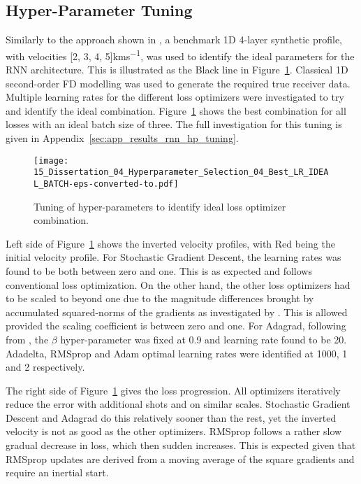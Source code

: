 \subsection{Hyper-Parameter Tuning}\label{sec:rnn_hp_tunin}
Similarly to the approach shown in \cite{Sun2019}, a benchmark 1D 4-layer synthetic profile, with velocities [2, 3, 4, 5]\si{kms^{-1}}, was used to identify the ideal parameters for the RNN architecture. This is illustrated as the Black line in Figure~\ref{fig:rnn_hp_tuning}. Classical 1D second-order FD modelling was used to generate the required true receiver data. Multiple learning rates for the different loss optimizers were investigated to try and identify the ideal combination. Figure~\ref{fig:rnn_hp_tuning} shows the best combination for all losses with an ideal batch size of three. The full investigation for this tuning is given in Appendix~\ref{sec:app_results_rnn_hp_tuning}. 

\begin{figure}[ht!]
    \centering
    \texttt{[image: 15\_Dissertation\_04\_Hyperparameter\_Selection\_04\_Best\_LR\_IDEAL\_BATCH-eps-converted-to.pdf]}
    \caption[Hyper-Parameter tuning.]{Tuning of hyper-parameters to identify ideal loss optimizer combination.}
    \label{fig:rnn_hp_tuning}
\end{figure}

Left side of Figure~\ref{fig:rnn_hp_tuning} shows the inverted velocity profiles, with Red being the initial velocity profile. For Stochastic Gradient Descent, the learning rates was found to be both between zero and one. This is as expected and follows conventional loss optimization. On the other hand, the other loss optimizers had to be scaled to beyond one due to the magnitude differences brought by accumulated squared-norms of the gradients as investigated by \citet{Sun2018}. This is allowed provided the scaling coefficient is between zero and one. For Adagrad, following from \cite{Duchi2011}, the $\beta$ hyper-parameter was fixed at 0.9 and learning rate found to be 20. Adadelta, RMSprop and Adam optimal learning rates were identified at 1000, 1 and 2 respectively. 

The right side of Figure~\ref{fig:rnn_hp_tuning} gives the loss progression. All optimizers iteratively reduce the error with additional shots and on similar scales. Stochastic Gradient Descent and Adagrad do this relatively sooner than the rest, yet the inverted velocity is not as good as the other optimizers. RMSprop follows a rather slow gradual decrease in loss, which then sudden increases. This is expected given that RMSprop updates are derived from a moving average of the square gradients and require an inertial start.

